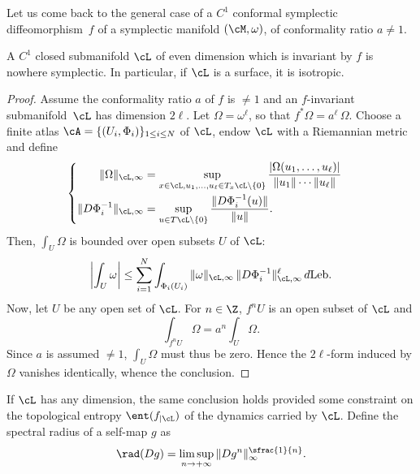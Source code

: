 Let us come back to the general case of a $C^1$ conformal symplectic diffeomorphism~$f$ of a symplectic manifold $(\cM,\omega)$, of conformality ratio $a \neq 1$.

\begin{proposition}
A $C^1$ closed submanifold ${\cL}$ of even dimension which is invariant by $f$ is nowhere symplectic. In particular, if $\cL$ is a surface, it is isotropic.
\end{proposition}

\begin{proof}
Assume the conformality ratio $a$ of $f$ is $\neq 1$ and an $f$-invariant submanifold~$\cL$ has dimension $2\ell$. Let $\Omega = \omega^\ell$, so that $f^*\Omega=a^\ell\, \Omega$. Choose a
finite atlas $\cA =\{ (U_i, \Phi_i) \}_{1\leq i\leq N}$ of
${\cL}$, endow ${\cL}$ with a Riemannian metric and define\vspace*{-3pt}\enlargethispage{.5\baselineskip}
\[
\begin{cases}
\begin{aligned}
\|\Omega\|_{\cL,\infty}&=\sup_{x\in{\cL}, u_1,\dots,u_\ell \in T_x{\cL}\setminus\{
0\}}\frac{\vert\Omega (u_1,\dots,u_\ell)\vert}{\| u_1\| \cdots  \| u_\ell\|}\\
\|D\Phi_i^{-1}\|_{\cL,\infty} &= \sup_{u \in T\cL \setminus \{0\}}
\frac{\|D\Phi_i^{-1}(u)\|}{\|u\|}.
\end{aligned}
\end{cases}
\]
Then,
$\int_U \Omega$ is bounded over open subsets $U$ of $\cL$:\vspace*{-3pt}
\begin{equation}\label{E1}
\left|\int_U\omega\right| \leq\sum_{i=1}^N\int_{\Phi_i(U_i)} \|\omega\|_{\cL,\infty} \, \|
D\Phi_i^{-1}\|_{\cL,\infty}^\ell \, d\text{Leb}.
\end{equation}
Now, let $U$ be any open set of $\cL$. For $n \in \Z$, $f^nU$ is an open subset of $\cL$ and\vspace*{-3pt}
\[
\int_{f^nU}\Omega=a^n\int_U\Omega.
\]
Since $a$ is assumed $\neq 1$, $\int_U \Omega$ must thus be zero. Hence the $2\ell$-form induced by $\Omega$ vanishes identically, whence the conclusion.
\end{proof}

If $\cL$ has any dimension, the same conclusion holds provided some constraint on the topological entropy $\ent (f_{|\cL})$ of the dynamics carried by $\cL$. Define the spectral radius of a self-map $g$ as\vspace*{-3pt}
\[
\rad (Dg) = \limsup_{n\to+\infty} \| Dg^{n} \|_\infty^{\sfrac{1}{n}}.
\]

